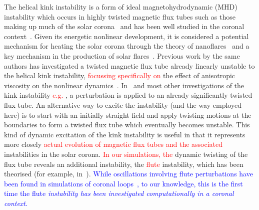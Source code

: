 \documentclass[12pt]{article}
\newcommand{\rs}[2]{\textcolor{red}{#2}}
\newcommand{\jq}[2]{\textcolor{blue}{#2}}
\begin{document}
The helical kink instability is a form of ideal magnetohydrodynamic
(MHD) instability which occurs in highly twisted magnetic flux tubes
such as those making up much of the solar
corona~\cite{realeCoronalLoopsObservations2014} and has been well
studied in the coronal
context~\cite{hoodKinkInstabilitySolar1979,hoodCoronalHeatingMagnetic2009,browningSolarCoronalHeating2003b,barefordShockHeatingNumerical2015,quinnEffectAnisotropicViscosity2020}. Given
its energetic nonlinear development, it is considered a potential
mechanism for heating the solar corona through the theory of
nanoflares~\cite{klimchukSolvingCoronalHeating2006,browningMechanismsSolarCoronal1991}
and a key mechanism in the production of solar
flares~\cite{hoodKinkInstabilitySolar1979}. Previous work by the same
authors has investigated a twisted magnetic flux tube already linearly
unstable to the helical kink instability, \rs{investigating particularly}{focussing specifically on}
the effect of anisotropic viscosity on the nonlinear
dynamics~\cite{quinnEffectAnisotropicViscosity2020}. In~\cite{quinnEffectAnisotropicViscosity2020}
and most other investigations of the kink instability
\rs{}{e.g. \cite{hoodCoronalHeatingMagnetic2009}}, a perturbation 
is applied to an already significantly twisted flux tube. An
alternative way to excite the instability (and the way employed here)
is to start with an initially straight field and apply twisting
motions at the boundaries to form a twisted flux tube which eventually
becomes unstable. This kind of dynamic excitation of the kink
instability is useful in that it represents more closely \rs{the real
development of a magnetic flux tube and associated}{actual evolution
  of magnetic flux tubes and the associated} instabilities in 
the solar corona. \rs{The}{In our simulations, the}
dynamic twisting of the flux tube reveals an additional instability,
the \rs{fluting}{flute} instability, which has been theorised (for example,
in~\cite{priestMagnetohydrodynamicsSuna}). \jq{}{While oscillations involving flute perturbations have been found in simulations of coronal loops~\cite{terradasEffectMagneticTwist2018}, to our knowledge, this is the first time the flute \em{instability} has been investigated computationally in a coronal context.}
\end{document}
